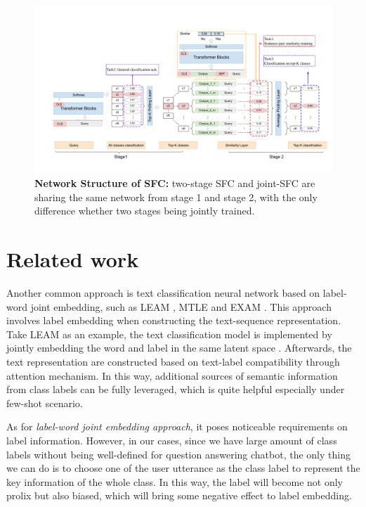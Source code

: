 \documentclass[letterpaper]{article} %
\begin{document}
  \begin{figure}[t]
    \begin{centering}
      \includegraphics[scale=0.72]{picture/picture4} 
      \par
    \end{centering}
    \caption{
      \textbf{Network Structure of SFC:} two-stage SFC and joint-SFC are sharing
      the  same  network  from  stage  1  and  stage 2, with the only difference
      whether two stages being jointly trained.
    }
    \label{fig:framework}
  \end{figure}

  \section{Related work}

  Another  common  approach  is  text  classification  neural  network  based on
  label-word     joint     embedding,    such    as    LEAM \cite{wang2018joint},
  MTLE \cite{zhang2017multi}   and   EXAM \cite{du2019explicit}.   This   approach
  involves  label  embedding when constructing the text-sequence representation.
  Take  LEAM  as  an  example,  the  text classification model is implemented by
  jointly    embedding    the    word    and    label   in   the   same   latent
  space \cite{wang2018joint}. Afterwards, the text representation are constructed
  based  on  text-label  compatibility through attention mechanism. In this way,
  additional  sources  of  semantic  information  from class labels can be fully
  leveraged, which is quite helpful especially under few-shot scenario.

  As for \emph{label-word joint
  embedding  approach},  it  poses  noticeable requirements on label information.
  However,  in  our  cases,  since  we have large amount of class labels without
  being well-defined for question answering chatbot, the only thing we can do is
  to  choose  one  of the user utterance as the class label to represent the key
  information  of  the  whole class. In this way, the label will become not only
  prolix  but  also  biased,  which  will  bring  some  negative effect to label
  embedding.  
\end{document}
